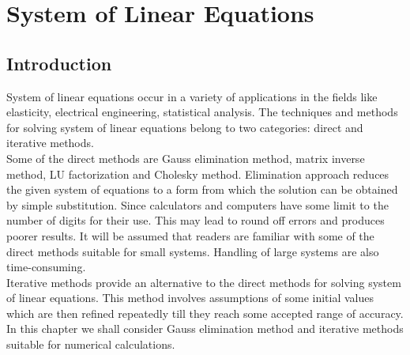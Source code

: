 \documentclass[12pt,class=book,crop=false]{standalone}
\begin{document}
\chapter{System of Linear Equations}
\section{Introduction}
System of linear equations occur in a variety of applications in the fields like elasticity, electrical engineering, statistical analysis. The techniques and methods for solving system of linear equations belong to two categories: direct and iterative methods.\\
Some of the direct methods are Gauss elimination method, matrix inverse method, LU factorization and Cholesky method. Elimination approach reduces the given system of equations to a form from which the solution can be obtained by simple substitution. Since calculators and computers have some limit to the number of digits for their use. This may lead to round off errors and produces poorer results. It will be assumed that readers are familiar with some of the direct methods suitable for small systems. Handling of large systems are also time-consuming.\\
Iterative methods provide an alternative to the direct methods for solving system of linear equations. This method involves assumptions of some initial values which are then refined repeatedly till they reach some accepted range of accuracy.\\
In this chapter we shall consider Gauss elimination method and iterative methods suitable for numerical calculations.
\end{document}
